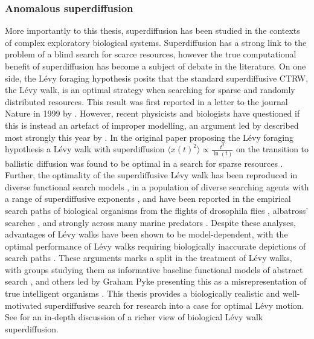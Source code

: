 \subsubsection*{Anomalous superdiffusion}
More importantly to this thesis, superdiffusion has been studied in the contexts of complex exploratory biological systems. Superdiffusion has a strong link to the problem of a blind search for scarce resources, however the true computational benefit of superdiffusion has become a subject of debate in the literature. On one side, the Lévy foraging hypothesis posits that the standard superdiffusive CTRW, the Lévy walk, is an optimal strategy when searching for sparse and randomly distributed resources. This result was first reported in a letter to the journal Nature in 1999 by \textcite{viswanathan_optimizing_1999}. However, recent physicists and biologists have questioned if this is instead an artefact of improper modelling, an argument led by described most strongly this year by \textcite{pyke_levy_2026}. In the original paper proposing the Lévy foraging hypothesis a Lévy walk with superdiffusion $\langle x(t) ^2 \rangle \propto \frac{t^2}{\ln(t)}$ on the transition to ballistic diffusion was found to be optimal in a search for sparse resources \cite{viswanathan_optimizing_1999}. Further, the optimality of the superdiffusive Lévy walk has been reproduced in diverse functional search models \cite{humphries_optimal_2014, campeau_evolutionary_2022, sims_optimal_2019}, in a population of diverse searching agents with a range of superdiffusive exponents \cite{clementi_search_2021}, and have been reported in the empirical search paths of biological organisms from the flights of drosophila flies \cite{sims_optimal_2019, reynolds_free-flight_2007}, albatross' searches \cite{focardi_levy_2014, humphries_new_2013}, and strongly across many marine predators \cite{sims_scaling_2008, humphries_environmental_2010}. Despite these analyses, advantages of Lévy walks have been shown to be model-dependent, with the optimal performance of Lévy walks requiring biologically inaccurate depictions of search paths \cite{pyke_levy_2026, gautestad_levy_2013, pyke_understanding_2015}. These arguments marks a split in the treatment of Lévy walks, with groups studying them as informative baseline functional models of abstract search \cite{viswanathan_optimizing_1999, gautestad_levy_2013, humphries_optimal_2014, clementi_search_2021}, and others led by Graham Pyke presenting this as a misrepresentation of true intelligent organisms \cite{pyke_levy_2026, pyke_understanding_2015, benhamou_ultimate_2015}. This thesis provides a biologically realistic and well-motivated superdiffusive search for research into a case for optimal Lévy motion. See \textcite{reynolds_liberating_2015} for an in-depth discussion of a richer view of biological Lévy walk superdiffusion.
